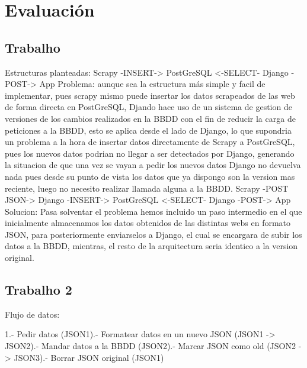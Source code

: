\chapter[Evaluación]{Evaluación}
\label{Chap4}

\section{Trabalho}
Estructuras planteadas:\newline
Scrapy -INSERT-> PostGreSQL <-SELECT- Django -POST-> App\newline
Problema: aunque sea la estructura más simple y facil de implementar, pues scrapy mismo puede insertar los datos scrapeados de las web de forma directa en PostGreSQL, Djando hace uso de un sistema de gestion de versiones de los cambios realizados en la BBDD con el fin de reducir la carga de peticiones a la BBDD, esto se aplica desde el lado de Django, lo que supondria un problema a la hora de insertar datos directamente de Scrapy a PostGreSQL, pues los nuevos datos podrian no llegar a ser detectados por Django, generando la situacion de que una vez se vayan a pedir los nuevos datos Django no devuelva nada pues desde su punto de vista los datos que ya dispongo son la version mas reciente, luego no necesito realizar llamada alguna a la BBDD.
\newline
\newline
Scrapy -POST JSON-> Django -INSERT-> PostGreSQL <-SELECT- Django -POST-> App\newline
Solucion: Pasa solventar el problema hemos incluido un paso intermedio en el que inicialmente almacenamos los datos obtenidos de las distintas webs en formato JSON, para posteriormente enviarselos a Django, el cual se encargara de subir los datos a la BBDD, mientras, el resto de la arquitectura seria identico a la version original.

\section{Trabalho 2}
Flujo de datos:\newline

1.- Pedir datos (JSON1).- Formatear datos en un nuevo JSON (JSON1 -> JSON2).- Mandar datos a la BBDD (JSON2).- Marcar JSON como old (JSON2 -> JSON3).- Borrar JSON original (JSON1)\newline

